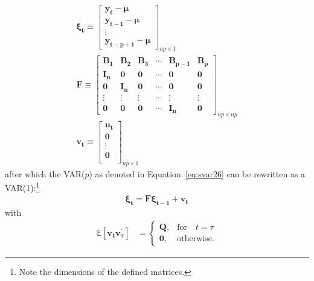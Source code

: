 \documentclass[a4paper,11pt,listof=nochaptergap,oneside,pointednumbers,bibtotoc,bigheadings,liststotoc]{scrbook}
\theoremstyle{mysatz}
\theoremstyle{mydefinition}
\theoremstyle{mybemerkung}
\newcommand{\vect}[1]{\boldsymbol{\mathbf{#1}}}
\begin{document}
\begin{enumerate}
	\begin{equation} \label{eq:svar27}
	\begin{split}
		\vect{\xi_t}	 \equiv \begin{bmatrix}
    						\vect{y_t}-\vect{\mu}\\
						\vect{y_{t-1}}-\vect{\mu} \\
						\vdots \\
						\vect{y_{t-p+1}}-\vect{\mu}
 						\end{bmatrix}_{np \times 1} \\
		\vect{F} \equiv \begin{bmatrix}
    						\vect{B_1} & \vect{B_2} & \vect{B_3} & \cdots & \vect{B_{p-1}} & \vect{B_p}\\
						\vect{I_n} & \vect{0} & \vect{0} & \cdots & \vect{0} & \vect{0}\\
						\vect{0} & \vect{I_n} & \vect{0} & \cdots & \vect{0} & \vect{0}\\
						\vdots & \vdots & \vdots & \cdots & \vdots & \vdots\\
						\vect{0} & \vect{0} & \vect{0} & \cdots & \vect{I_n} & \vect{0}
 						\end{bmatrix}_{np \times np}\\
		\vect{v_t} \equiv \begin{bmatrix}
    						\vect{u_t} \\
						\vect{0} \\
						\vdots \\
						\vect{0} \\
 						\end{bmatrix}_{np \times 1}
	\end{split}								
	\end{equation}	
	after which the VAR($p$) as denoted in Equation~\ref{eq:svar26} can be rewritten as a VAR(1):\footnote{Note the dimensions of the defined matrices.}
	\begin{equation} \label{eq:svar28}
	\begin{split}
		\vect{\xi_t} = \vect{F}\vect{\xi_{t-1}} + \vect{v_t}
	\end{split}								
	\end{equation}	
	with
	\begin{equation} \label{eq:svar29}
	\begin{split}
		\mathbb{E}[\vect{v_t}\vect{v_{\tau}^'}] & =     \begin{cases}
      												\vect{Q}, & \text{for} \quad t = \tau \\
      												\vect{0}, & \text{otherwise.}

\end{cases}
\end{split}
\end{equation}
\end{enumerate}
\end{document}
